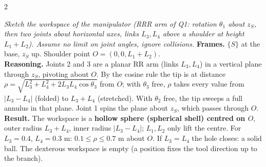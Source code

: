 \begin{multicols}{2}
\columnbreak
{}
\begin{examq}
\label{w3:q2box}
\emph{Sketch the workspace of the manipulator (RRR arm of Q1: rotation $\theta_1$ about $z_S$, then two joints about horizontal axes, links $L_3,L_4$ above a shoulder at height $L_1+L_2$). Assume no limit on joint angles, ignore collisions.}
\solution
\textbf{Frames.} $\{S\}$ at the base, $z_S$ up. Shoulder point $O=(0,0,L_1+L_2)$.\\
\textbf{Reasoning.} Joints 2 and 3 are a planar RR arm (links $L_3,L_4$) in a vertical plane through $z_S$, pivoting about $O$. By the cosine rule the tip is at distance $\rho=\sqrt{L_3^2+L_4^2+2L_3L_4\cos\theta_3}$ from $O$; with $\theta_3$ free, $\rho$ takes every value from $|L_3-L_4|$ (folded) to $L_3+L_4$ (stretched). With $\theta_2$ free, the tip sweeps a full annulus in that plane. Joint 1 spins the plane about $z_S$, which passes through $O$.\\
\textbf{Result.} The workspace is a \textbf{hollow sphere (spherical shell) centred on $O$}, outer radius $L_3+L_4$, inner radius $|L_3-L_4|$; $L_1,L_2$ only lift the centre. For $L_3=0.4$, $L_4=0.3$ m: $0.1\le\rho\le0.7$ m about $O$. If $L_3=L_4$ the hole closes: a solid ball. The dexterous workspace is empty (a position fixes the tool direction up to the branch).
\begin{center}
\end{center}
\end{examq}
\end{multicols}
